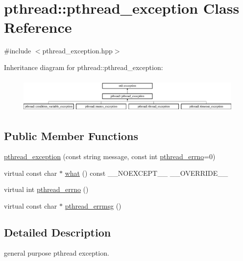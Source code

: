 \hypertarget{classpthread_1_1pthread__exception}{}\section{pthread\+:\+:pthread\+\_\+exception Class Reference}
\label{classpthread_1_1pthread__exception}


{\ttfamily \#include $<$pthread\+\_\+exception.\+hpp$>$}

Inheritance diagram for pthread\+:\+:pthread\+\_\+exception\+:\begin{figure}[H]
\begin{center}
\leavevmode
\includegraphics[height=1.794872cm]{classpthread_1_1pthread__exception}
\end{center}
\end{figure}
\subsection*{Public Member Functions}
\begin{DoxyCompactItemize}
\item 
\hyperlink{classpthread_1_1pthread__exception_a157d4379b6eddcc82ca504534c51abe6}{pthread\+\_\+exception} (const string message, const int \hyperlink{classpthread_1_1pthread__exception_a8a5c22a403ebd14635e912295fe02a1e}{pthread\+\_\+errno}=0)
\item 
virtual const char $\ast$ \hyperlink{classpthread_1_1pthread__exception_a6a4ff68b095f2e0ddb646b75af790c73}{what} () const \+\_\+\+\_\+\+N\+O\+E\+X\+C\+E\+P\+T\+\_\+\+\_\+ \+\_\+\+\_\+\+O\+V\+E\+R\+R\+I\+D\+E\+\_\+\+\_\+
\item 
virtual int \hyperlink{classpthread_1_1pthread__exception_a8a5c22a403ebd14635e912295fe02a1e}{pthread\+\_\+errno} ()
\item 
virtual const char $\ast$ \hyperlink{classpthread_1_1pthread__exception_aa2371eb23800817723174186450e9716}{pthread\+\_\+errmsg} ()
\end{DoxyCompactItemize}


\subsection{Detailed Description}
general purpose pthread exception. 

